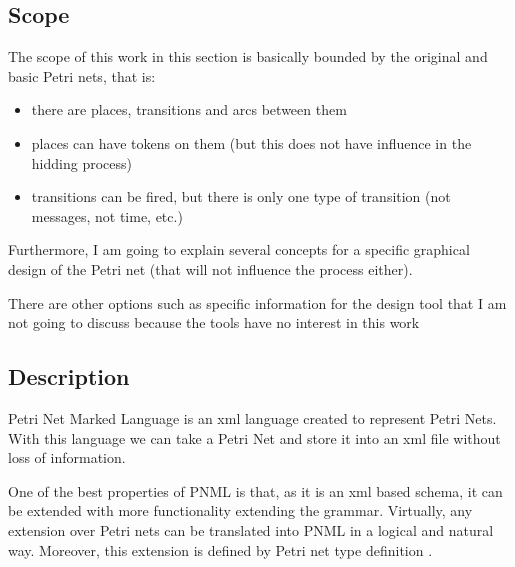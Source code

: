 \subsection{Scope}
The scope of this work in this section is basically bounded by the original
and basic Petri nets, that is:
\begin{itemize}
\item there are places, transitions and arcs between them
\item places can have tokens on them (but this does not have influence in
the hidding process)
\item transitions can be fired, but there is only one type of transition
(not messages, not time, etc.)
\end{itemize}

Furthermore, I am going to explain several concepts for a specific graphical
design of the Petri net (that will not influence the process either).

There are other options such as specific information for the design tool
that I am not going to discuss because the tools have no interest in this work 

\subsection{Description}
Petri Net Marked Language is an xml language created to represent Petri Nets. With this language we can take a Petri Net and store it into an xml file without loss of information.

One of the best properties of PNML is that, as it is an xml based schema,
it can be extended with more functionality extending the grammar.
Virtually, any extension over Petri nets can be translated into PNML in a logical and natural way.
Moreover, this extension is defined by Petri net type definition \cite{PNML-Billington2003483,PNML-iso/iec-15909-2:2011}.
 

